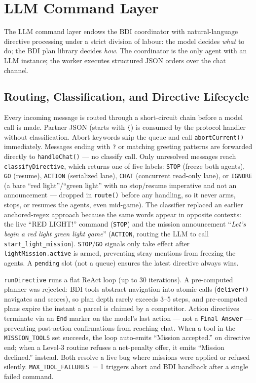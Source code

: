 \section{LLM Command Layer}
The LLM command layer endows the BDI coordinator with natural-language directive processing under a strict division of labour: the model decides \textit{what} to do; the BDI plan library decides \textit{how}. The coordinator is the only agent with an LLM instance; the worker executes structured JSON orders over the chat channel.

\subsection{Routing, Classification, and Directive Lifecycle}
Every incoming message is routed through a short-circuit chain before a model call is made. Partner JSON (starts with \texttt{\{}) is consumed by the protocol handler without classification. Abort keywords skip the queue and call \texttt{abortCurrent()} immediately. Messages ending with \texttt{?} or matching greeting patterns are forwarded directly to \texttt{handleChat()} — no classify call. Only unresolved messages reach \texttt{classifyDirective}, which returns one of five labels: \texttt{STOP} (freeze both agents), \texttt{GO} (resume), \texttt{ACTION} (serialized lane), \texttt{CHAT} (concurrent read-only lane), or \texttt{IGNORE} (a bare ``red light''/``green light'' with no stop/resume imperative and not an announcement --- dropped in \texttt{route()} before any handling, so it never arms, stops, or resumes the agents, even mid-game). The classifier replaced an earlier anchored-regex approach because the same words appear in opposite contexts: the live ``RED LIGHT!'' command (\texttt{STOP}) and the mission announcement ``\textit{Let's begin a red light green light game}'' (\texttt{ACTION}, routing the LLM to call \texttt{start\_light\_mission}). \texttt{STOP}/\texttt{GO} signals only take effect after \texttt{lightMission.active} is armed, preventing stray mentions from freezing the agents. A \texttt{pending} slot (not a queue) ensures the latest directive always wins.

\texttt{runDirective} runs a flat ReAct loop (up to 30 iterations). A pre-computed planner was rejected: BDI tools abstract navigation into atomic calls (\texttt{deliver()} navigates and scores), so plan depth rarely exceeds 3--5 steps, and pre-computed plans expire the instant a parcel is claimed by a competitor. Action directives terminate via an \texttt{End} marker on the model's last action — not a \texttt{Final Answer} — preventing post-action confirmations from reaching chat. When a tool in the \texttt{MISSION\_TOOLS} set succeeds, the loop auto-emits ``Mission accepted.'' on directive end; when a Level-3 routine refuses a net-penalty offer, it emits ``Mission declined.'' instead. Both resolve a live bug where missions were applied or refused silently. \texttt{MAX\_TOOL\_FAILURES}~= 1 triggers abort and BDI handback after a single failed command.

